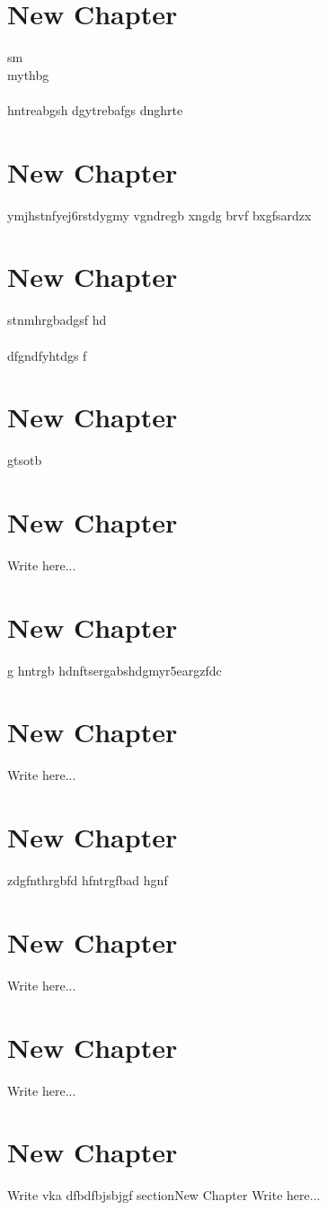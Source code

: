 \documentclass{article}
\begin{document}
\section{New Chapter}
sm \\mythbg \\\\hntreabgsh dgytrebafgs dnghrte
\section{New Chapter}
ymjhstnfyej6rstdygmy vgndregb xngdg  brvf bxgfsardzx 
\section{New Chapter}
stnmhrgbadgsf hd \\ \\dfgndfyhtdgs f
\section{New Chapter}
gtsotb
\section{New Chapter}
Write here...
\section{New Chapter}
g hntrgb hdnftsergabshdgmyr5eargzfdc
\section{New Chapter}
Write here...
\section{New Chapter}
zdgfnthrgbfd hfntrgfbad hgnf
\section{New Chapter}
Write here...
\section{New Chapter}
Write here...
\section{New Chapter}
Write vka dfbdfbjsbjgf
section{New Chapter}
Write here...
\end{document}
